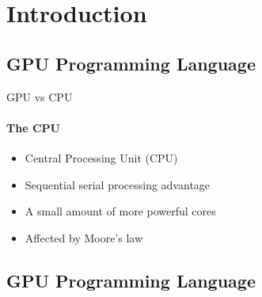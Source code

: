 \section{Introduction}
\subsection{GPU Programming Language}
\begin{frame}{GPU vs CPU}
\framesubtitle{The CPU}
	\begin{itemize}
        \item Central Processing Unit (CPU)
        \item Sequential serial processing advantage
        \item A small amount of more powerful cores
        \item Affected by Moore’s law
    \end{itemize}
\end{frame}

\subsection{GPU Programming Language}

